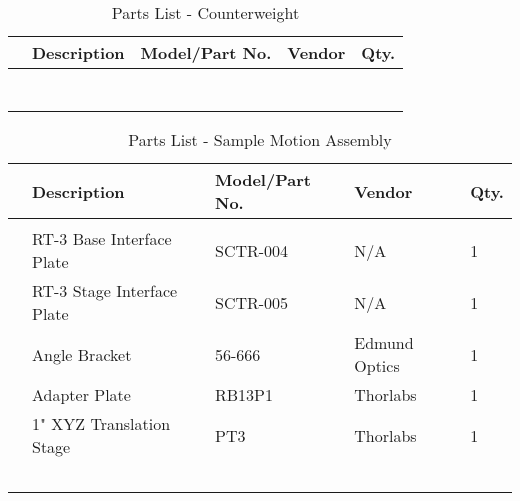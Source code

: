 \begin{table}[htbp]
    \renewcommand{\arraystretch}{1.25}
    \caption{Parts List - Counterweight}
    \begin{center}
        \begin{tabular}{ l l l l l }
        \toprule[2pt]
        \textbf{} & \textbf{Description} & \textbf{Model/Part No.}  & \textbf{Vendor} & \textbf{Qty.} \\
        \midrule[0.75pt]
        &  &  &  &  \\
        &  &  &  &  \\
        &  &  &  &  \\
        &  &  &  &  \\
        &  &  &  &  \\
        &  &  &  &  \\
        &  &  &  &  \\
        \bottomrule[2pt]
        \end{tabular}
        \label{tab:parts_list_counterweight}
    \end{center}
\end{table}

\begin{table}[htbp]
    \renewcommand{\arraystretch}{1.25}
    \caption{Parts List - Sample Motion Assembly}
    \begin{center}
        \begin{tabular}{ l l l l l }
        \toprule[2pt]
        \textbf{} & \textbf{Description} & \textbf{Model/Part No.}  & \textbf{Vendor} & \textbf{Qty.} \\
        \midrule[0.75pt]
        &  &  &  &  \\
        & RT-3 Base Interface Plate & SCTR-004 & N/A & 1 \\
        & RT-3 Stage Interface Plate & SCTR-005 & N/A & 1 \\
        & Angle Bracket & 56-666 & Edmund Optics & 1 \\
        & Adapter Plate & RB13P1 & Thorlabs & 1 \\
        & 1" XYZ Translation Stage & PT3 & Thorlabs & 1 \\
        &  &  &  &  \\
        &  &  &  &  \\
        &  &  &  &  \\
        &  &  &  &  \\
        &  &  &  &  \\
        \bottomrule[2pt]
        \end{tabular}
        \label{tab:parts_list_sample_motion_assy}
    \end{center}
\end{table}

